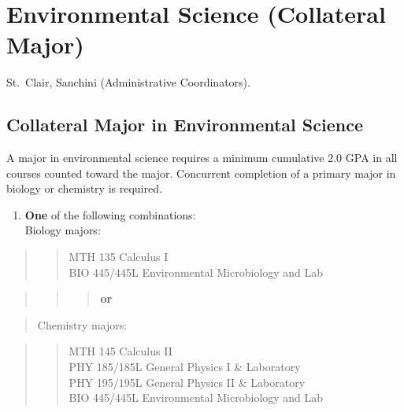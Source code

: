 \documentclass[
  letterpaper,
]{scrbook}
\providecommand{\tightlist}{%
  \setlength{\itemsep}{0pt}\setlength{\parskip}{0pt}}
\begin{document}
\section{Environmental Science (Collateral
Major)}\label{sec-environmental-science}

St.~Clair, Sanchini (Administrative Coordinators).

\subsection{Collateral Major in Environmental
Science}\label{collateral-major-in-environmental-science}

A major in environmental science requires a minimum cumulative 2.0 GPA
in all courses counted toward the major. Concurrent completion of a
primary major in biology or chemistry is required.

\begin{enumerate}
\def\labelenumi{\arabic{enumi}.}
\tightlist
\item
  \textbf{One} of the following combinations:\\
  Biology majors:
\end{enumerate}

\begin{quote}
\begin{quote}
MTH 135 Calculus I\\
BIO 445/445L Environmental Microbiology and Lab
\end{quote}
\end{quote}

\begin{quote}
\begin{quote}
\begin{quote}
\textbf{or}
\end{quote}
\end{quote}
\end{quote}

\begin{quote}
Chemistry majors:
\end{quote}

\begin{quote}
\begin{quote}
MTH 145 Calculus II\\
PHY 185/185L General Physics I \& Laboratory\\
PHY 195/195L General Physics II \& Laboratory\\
BIO 445/445L Environmental Microbiology and Lab
\end{quote}
\end{quote}
\end{document}
